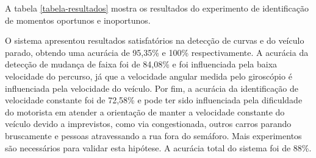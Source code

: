A tabela \ref{tabela-resultados} mostra os resultados do experimento de identificação de momentos oportunos e inoportunos.

\begin{table}[h]
\centering
\caption{Resultados do experimento de identificação dos momentos}
\label{tabela-resultados}
\end{table}

O sistema apresentou resultados satisfatórios na detecção de curvas e do veículo parado, obtendo uma acurácia de 95,35\% e 100\% respectivamente. A
acurácia da detecção de mudança de faixa foi de 84,08\% e foi influenciada pela baixa velocidade do percurso, já que a velocidade angular medida pelo
giroscópio é influenciada pela velocidade do veículo. Por fim, a acurácia da identificação de velocidade constante foi de 72,58\% e pode ter sido
influenciada pela dificuldade do motorista em atender a orientação de manter a velocidade constante do veículo devido a imprevistos, como via congestionada,
outros carros parando bruscamente e pessoas atravessando a rua fora do semáforo. Mais experimentos são necessários para validar esta hipótese. A acurácia total
do sistema foi de 88\%.
